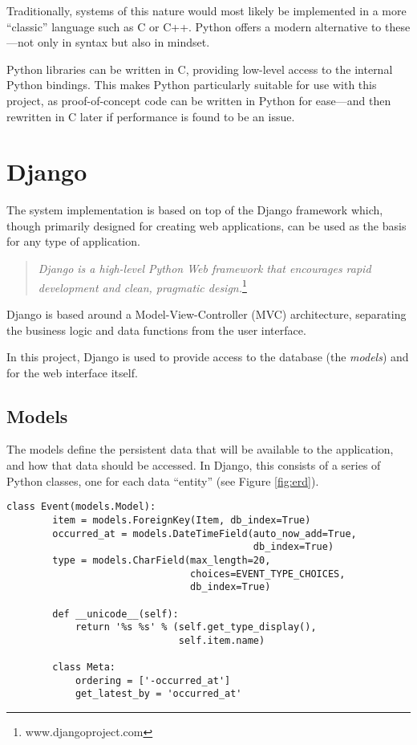 Traditionally, systems of this nature would most likely be implemented in
a more ``classic'' language such as C or C++. Python offers a modern
alternative to these---not only in syntax but also in mindset.

Python libraries can be written in C, providing low-level access to
the internal Python bindings. This makes Python particularly suitable for use
with this project, as proof-of-concept code can be written in Python for
ease---and then rewritten in C later if performance is found to be an issue.

\section{Django}

The system implementation is based on top of the Django framework which, though
primarily designed for creating web applications, can be used as the basis for
any type of application.

\begin{quote}
    \emph{Django is a high-level Python Web framework that encourages rapid
    development and clean, pragmatic design.}\footnote{www.djangoproject.com}
\end{quote}

Django is based around a Model-View-Controller (MVC) architecture, separating
the business logic and data functions from the user interface.

In this project, Django is used to provide access to the database (the
\emph{models}) and for the web interface itself.

\subsection{Models}

The models define the persistent data that will be available to the
application, and how that data should be accessed. In Django, this consists of
a series of Python classes, one for each data ``entity'' (see Figure
\ref{fig:erd}).

\begin{singlespacing}
\begin{lstlisting}[caption=The `Event' model, label=lst:event-model]
    class Event(models.Model):
        item = models.ForeignKey(Item, db_index=True)
        occurred_at = models.DateTimeField(auto_now_add=True,
                                           db_index=True)
        type = models.CharField(max_length=20,
                                choices=EVENT_TYPE_CHOICES,
                                db_index=True)

        def __unicode__(self):
            return '%s %s' % (self.get_type_display(),
                              self.item.name)

        class Meta:
            ordering = ['-occurred_at']
            get_latest_by = 'occurred_at'
\end{lstlisting}
\end{singlespacing}

